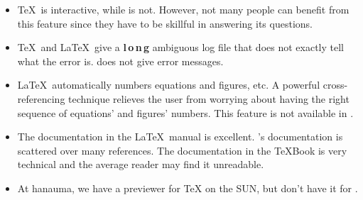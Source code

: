 \begin{itemize}
\item \TeX\ is interactive, while \troff\/ is not. However, not many people can
benefit from this feature since they have to be skillful in answering
its questions.

\item \TeX\ and \LaTeX\ give a {\bf l\,o\,n\,g} ambiguous log file that does not
exactly tell what the error is. \Troff\/ does not give error messages.

\item \LaTeX\ automatically numbers equations and figures, etc. A powerful
cross-referencing technique relieves the user from worrying about having
the right sequence of equations' and figures' numbers. This feature
is not available in \troff.

\item The documentation in the \LaTeX\ manual is excellent.
\Troff\/'s documentation is scattered over many references.
The documentation in the \TeX Book is very technical and the average reader
may find it unreadable.

\item At hanauma, we have a previewer for TeX on the SUN, but don't have it
for \troff.
\end{itemize}

